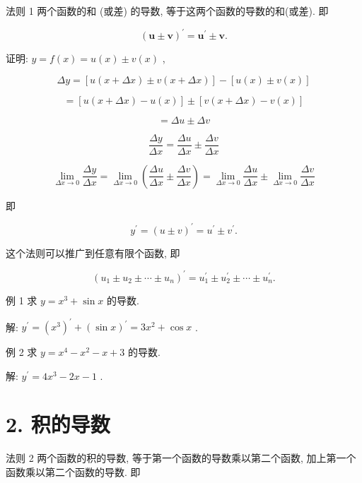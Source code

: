 \documentclass[10pt]{article}
\begin{document}
法则 1 两个函数的和 (或差) 的导数, 等于这两个函数的导数的和(或差). 即

\[
{\left( \mathbf{u} \pm \mathbf{v}\right) }^{\prime } = {\mathbf{u}}^{\prime } \pm \mathbf{v}.
\]

证明: \(y = f\left( x\right) = u\left( x\right) \pm v\left( x\right)\) ,

\[
{\Delta y} = \left\lbrack {u\left( {x + {\Delta x}}\right) \pm v\left( {x + {\Delta x}}\right) }\right\rbrack - \left\lbrack {u\left( x\right) \pm v\left( x\right) }\right\rbrack
\]

\[
= \left\lbrack {u\left( {x + {\Delta x}}\right) - u\left( x\right) }\right\rbrack \pm \left\lbrack {v\left( {x + {\Delta x}}\right) - v\left( x\right) }\right\rbrack
\]

\[
= {\Delta u} \pm {\Delta v}
\]

\[
\frac{\Delta y}{\Delta x} = \frac{\Delta u}{\Delta x} \pm \frac{\Delta v}{\Delta x}
\]

\[
\mathop{\lim }\limits_{{{\Delta x} \rightarrow 0}}\frac{\Delta y}{\Delta x} = \mathop{\lim }\limits_{{{\Delta x} \rightarrow 0}}\left( {\frac{\Delta u}{\Delta x} \pm \frac{\Delta v}{\Delta x}}\right) = \mathop{\lim }\limits_{{{\Delta x} \rightarrow 0}}\frac{\Delta u}{\Delta x} \pm \mathop{\lim }\limits_{{{\Delta x} \rightarrow 0}}\frac{\Delta v}{\Delta x}
\]

即

\[
{y}^{\prime } = {\left( u \pm v\right) }^{\prime } = {u}^{\prime } \pm {v}^{\prime }.
\]

这个法则可以推广到任意有限个函数, 即

\[
{\left( {u}_{1} \pm {u}_{2} \pm \cdots \pm {u}_{n}\right) }^{\prime } = {u}_{1}^{\prime } \pm {u}_{2}^{\prime } \pm \cdots \pm {u}_{n}^{\prime }.
\]

例 1 求 \(y = {x}^{3} + \sin x\) 的导数.

解: \({y}^{\prime } = {\left( {x}^{3}\right) }^{\prime } + {\left( \sin x\right) }^{\prime } = 3{x}^{2} + \cos x\) .

例 2 求 \(y = {x}^{4} - {x}^{2} - x + 3\) 的导数.

解: \({y}^{\prime } = 4{x}^{3} - {2x} - 1\) .

\section*{2. 积的导数}

法则 2 两个函数的积的导数, 等于第一个函数的导数乘以第二个函数, 加上第一个函数乘以第二个函数的导数. 即
\end{document}
